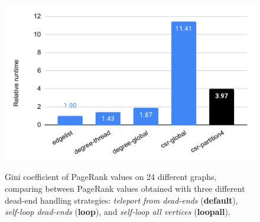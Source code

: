 \begin{figure}[hbtp]
  \centering
  \includegraphics[width=0.99\linewidth]{out/optimize-csr.pdf} \\[-2ex]
  \caption{Gini coefficient of PageRank values on 24 different graphs, comparing between PageRank values obtained with three different dead-end handling strategies: \textit{teleport from dead-ends} (\textbf{default}), \textit{self-loop dead-ends} (\textbf{loop}), and \textit{self-loop all vertices} (\textbf{loopall}).}
  \label{fig:optimize-csr}
\end{figure}
